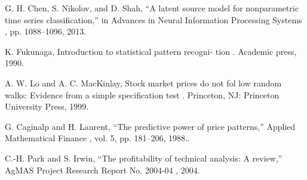  
\begin{thebibliography}{22}


\bibitem{} G.  H.  Chen,  S.  Nikolov,  and  D.  Shah,  “A  latent  source
model  for  nonparametric  time  series  classification,”  in
Advances   in   Neural   Information   Processing   Systems
,
pp. 1088–1096, 2013.

\bibitem{} K.  Fukunaga,
Introduction  to  statistical  pattern  recogni-
tion
.  Academic press, 1990.

\bibitem{}  A. W. Lo and A. C. MacKinlay,
Stock market prices do not
fol low random walks: Evidence from a simple specification
test
.  Princeton, NJ: Princeton University Press, 1999.

\bibitem{}  G.  Caginalp  and  H.  Laurent,  “The  predictive  power  of
price  patterns,”
Applied  Mathematical  Finance
,  vol.  5,
pp. 181–206, 1988..

\bibitem{}  C.-H.  Park  and  S.  Irwin,  “The  profitability  of  technical
analysis: A review,”
AgMAS Project Research Report No.
2004-04
, 2004.


\end{thebibliography}
